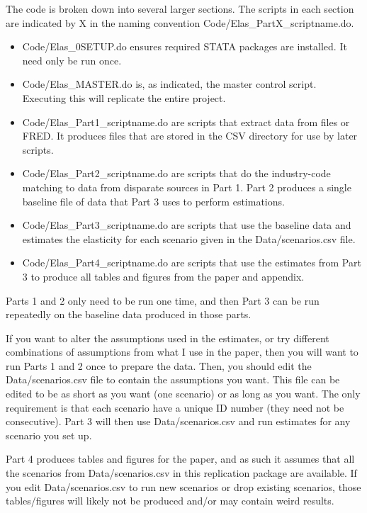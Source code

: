 \documentclass[
]{article}
\begin{document}
The code is broken down into several larger sections. The scripts in each section are indicated by X in the naming convention Code/Elas\_PartX\_scriptname.do.

\begin{itemize}
  \item Code/Elas\_0SETUP.do ensures required STATA packages are installed. It need only be run once.
  \item Code/Elas\_MASTER.do is, as indicated, the master control script. Executing this will replicate the entire project.
  \item Code/Elas\_Part1\_scriptname.do are scripts that extract data from files or FRED. It produces files that are stored in the CSV directory for use by later scripts. 
  \item Code/Elas\_Part2\_scriptname.do are scripts that do the industry-code matching to data from disparate sources in Part 1. Part 2 produces a single baseline file of data that Part 3 uses to perform estimations.
  \item Code/Elas\_Part3\_scriptname.do are scripts that use the baseline data and estimates the elasticity for each scenario given in the Data/scenarios.csv file. 
  \item Code/Elas\_Part4\_scriptname.do are scripts that use the estimates from Part 3 to produce all tables and figures from the paper and appendix. 
\end{itemize}

Parts 1 and 2 only need to be run one time, and then Part 3 can be run repeatedly on the baseline data produced in those parts. 

If you want to alter the assumptions used in the estimates, or try different combinations of assumptions from what I use in the paper, then you will want to run Parts 1 and 2 once to prepare the data. Then, you should edit the Data/scenarios.csv file to contain the assumptions you want. This file can be edited to be as short as you want (one scenario) or as long as you want. The only requirement is that each scenario have a unique ID number (they need not be consecutive). Part 3 will then use Data/scenarios.csv and run estimates for any scenario you set up. 

Part 4 produces tables and figures for the paper, and as such it assumes that all the scenarios from Data/scenarios.csv in this replication package are available. If you edit Data/scenarios.csv to run new scenarios or drop existing scenarios, those tables/figures will likely not be produced and/or may contain weird results. 
\end{document}

